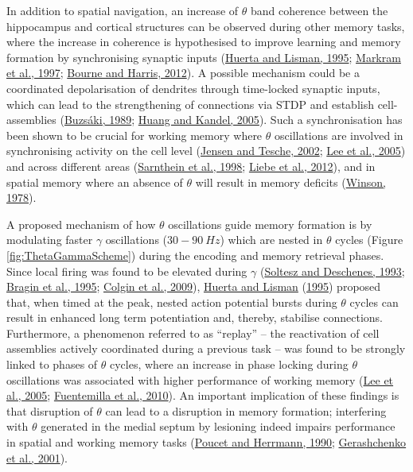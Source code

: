 \documentclass[
  12pt,
  a4paper,
  openany]{book}
\begin{document}
In addition to spatial navigation, an increase of \(\theta\) band coherence between the hippocampus and cortical structures can be observed during other memory tasks, where the increase in coherence is hypothesised to improve learning and memory formation by synchronising synaptic inputs (\protect\hyperlink{ref-huerta_bidirectional_1995}{Huerta and Lisman, 1995}; \protect\hyperlink{ref-markram_regulation_1997}{Markram et al., 1997}; \protect\hyperlink{ref-bourne_nanoscale_2012}{Bourne and Harris, 2012}). A possible mechanism could be a coordinated depolarisation of dendrites through time-locked synaptic inputs, which can lead to the strengthening of connections via STDP and establish cell-assemblies (\protect\hyperlink{ref-buzsaki_two-stage_1989}{Buzsáki, 1989}; \protect\hyperlink{ref-huang_theta_2005}{Huang and Kandel, 2005}). Such a synchronisation has been shown to be crucial for working memory where \(\theta\) oscillations are involved in synchronising activity on the cell level (\protect\hyperlink{ref-jensen_frontal_2002}{Jensen and Tesche, 2002}; \protect\hyperlink{ref-lee_phase_2005}{Lee et al., 2005}) and across different areas (\protect\hyperlink{ref-sarnthein_synchronization_1998}{Sarnthein et al., 1998}; \protect\hyperlink{ref-liebe_theta_2012}{Liebe et al., 2012}), and in spatial memory where an absence of \(\theta\) will result in memory deficits (\protect\hyperlink{ref-winson_loss_1978}{Winson, 1978}).

A proposed mechanism of how \(\theta\) oscillations guide memory formation is by modulating faster \(\gamma\) oscillations (\(30-90\ Hz\)) which are nested in \(\theta\) cycles (Figure \ref{fig:ThetaGammaScheme}) during the encoding and memory retrieval phases. Since local firing was found to be elevated during \(\gamma\) (\protect\hyperlink{ref-soltesz_low-_1993}{Soltesz and Deschenes, 1993}; \protect\hyperlink{ref-bragin_gamma_1995}{Bragin et al., 1995}; \protect\hyperlink{ref-colgin_frequency_2009}{Colgin et al., 2009}), \protect\hyperlink{ref-huerta_bidirectional_1995}{Huerta and Lisman} (\protect\hyperlink{ref-huerta_bidirectional_1995}{1995}) proposed that, when timed at the peak, nested action potential bursts during \(\theta\) cycles can result in enhanced long term potentiation and, thereby, stabilise connections. Furthermore, a phenomenon referred to as ``replay'' -- the reactivation of cell assemblies actively coordinated during a previous task -- was found to be strongly linked to phases of \(\theta\) cycles, where an increase in phase locking during \(\theta\) oscillations was associated with higher performance of working memory (\protect\hyperlink{ref-lee_phase_2005}{Lee et al., 2005}; \protect\hyperlink{ref-fuentemilla_theta-coupled_2010}{Fuentemilla et al., 2010}). An important implication of these findings is that disruption of \(\theta\) can lead to a disruption in memory formation; interfering with \(\theta\) generated in the medial septum by lesioning indeed impairs performance in spatial and working memory tasks (\protect\hyperlink{ref-poucet_septum_1990}{Poucet and Herrmann, 1990}; \protect\hyperlink{ref-gerashchenko_effects_2001}{Gerashchenko et al., 2001}).
\end{document}
